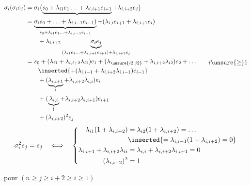 \[
\begin{aligned}
\sigma_i(\sigma_i s_j)&=\sigma_i\bigl(\underbrace{s_0+\lambda_{i1}e_1\ldots+\lambda_{i,i+1}e_{i+1}}+\lambda_{i,i+2}e_j\bigr)\\
&=\underbrace{\sigma_i s_0+\ldots+\lambda_{i,i-1}e_{i-1})}_{s_0+\lambda_{i1}e_1\ldots+\lambda_{i,i-1}e_{i-1}}+(\lambda_{i,i}e_{i+1}+\lambda_{i,i+1}e_i)\\
&\qquad+\lambda_{i,i+2}\underbrace{\sigma_i e_j}_{(\lambda_{i1}e_1\ldots+\lambda_{i,i+1}e_{i+1})+\lambda_{i,i+2}e_j}\\
&=s_0+(\lambda_{i1}+\lambda_{i,i+2}\lambda_{i1})e_1+(\lambda_{\unsure{i2|j2}}+\lambda_{i,i+2}\lambda_{i2})e_2+\ldots\\
&\qquad\inserted{+(\lambda_{i,i-1}+\lambda_{i,i+2}\lambda_{i,i-1})e_{i-1}}\\
&\qquad+(\underbrace{\lambda_{i,i+1}}_{!}+\lambda_{i,i+2}\lambda_{i,i})e_i\\
&\qquad+(\underbrace{\lambda_{i,i}}_{!}+\lambda_{i,i+2}\lambda_{i,i+1})e_{i+1}\\
&\qquad+(\lambda_{i,i+2})^2e_j
\end{aligned}
\qquad i\unsure{\geq}1
\]
\[
\begin{aligned}
\sigma_i^2s_j=s_j\quad\Longleftrightarrow\quad
\left\{\begin{aligned}
\lambda_{i1}(1+\lambda_{i,i+2})&=\lambda_{i2}(1+\lambda_{i,i+2})=\ldots\\
&\inserted{=\lambda_{i,i-1}(1+\lambda_{i,i+2})=0}\\
\lambda_{i,i+1}+\lambda_{i,i+2}\lambda_{ii}&=\lambda_{i,i}+\lambda_{i,i+2}\lambda_{i,i+1}=0\\
(\lambda_{i,i+2})^2&=1
\end{aligned}\right.
\end{aligned}
\]

pour $(n\geq j\geq i+2\geq i\geq1)$

